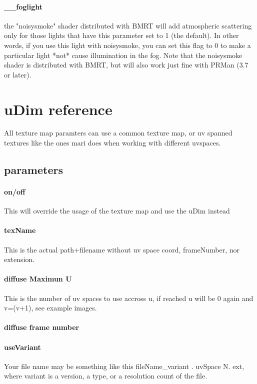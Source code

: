 \documentclass[final,letterpaper,twoside,12pt]{report}
\begin{document}
\subsubsection {\_\_foglight  }
the "noisysmoke" shader distributed with BMRT will add  atmospheric scattering only for those lights that have this  parameter set to 1 (the default).  In other words, if you use  this light with noisysmoke, you can set this flag to 0 to  make a particular light *not* cause illumination in the fog.  Note that the noisysmoke shader is distributed with BMRT, but  will also work just fine with PRMan (3.7 or later).
\smallskip





\chapter{uDim reference}
All texture map paramters can use a common texture map, or uv spanned textures like the ones mari does when working with different uvspaces.
\smallskip
\section {parameters}
\subsubsection {on/off}
This will override the usage of the texture map and use the uDim instead
\smallskip
\subsubsection {texName}
This is the actual path+filename without uv space coord, frameNumber, nor extension.
\smallskip
\subsubsection {diffuse Maximun U}
This is the number of uv spaces to use accross u, if reached u will be 0 again and v=(v+1), see example images.
\smallskip
\subsubsection {diffuse frame number}

\smallskip
\subsubsection {useVariant}
Your file name may be something like this fileName\_variant . uvSpace N. ext, where variant is a version, a type, or a resolution count of the file.
\smallskip
\end{document}
